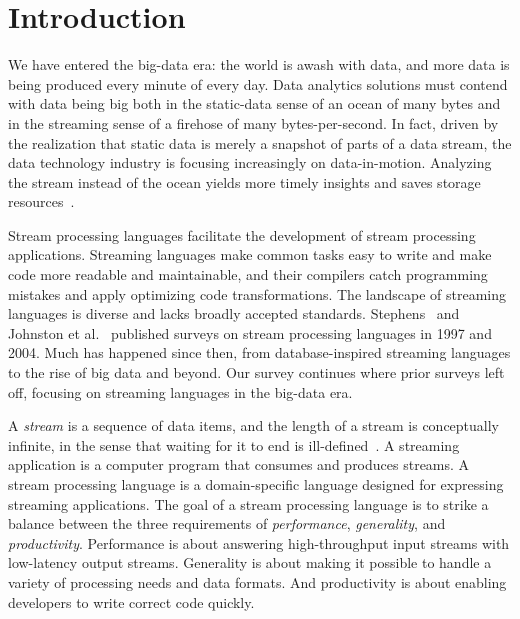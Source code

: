 \section{Introduction}\label{sec:introduction}

We have entered the big-data era: the world is awash with data, and
more data is being produced every minute of every day. Data analytics
solutions must contend with data being big both in the static-data sense of
an ocean of many bytes and in the streaming sense of a firehose of
many bytes-per-second. In fact, driven by the realization that static
data is merely a snapshot of parts of a data stream, the data technology
industry is focusing increasingly on data-in-motion. Analyzing
the stream instead of the ocean yields more timely insights and saves
storage resources~\cite{andrade2014fundamentals}.

Stream processing languages facilitate the development of stream
processing applications. Streaming languages make common tasks easy to
write and make code more readable and maintainable, and their
compilers catch programming mistakes and apply optimizing code
transformations. The landscape of streaming languages is diverse and
lacks broadly accepted standards.  Stephens~\cite{stephens_1997} and
Johnston et al.~\cite{johnston_hanna_millar_2004} published surveys on
stream processing languages in 1997 and 2004. Much has happened since
then, from database-inspired streaming languages to the rise of big
data and beyond. Our survey continues where prior surveys left off,
focusing on streaming languages in the big-data era.

A \emph{stream} is a sequence of data items, and the length of a
stream is conceptually infinite, in the sense that waiting for it to
end is ill-defined~\cite{muthukrishnan2005data}. A streaming application is a computer program that
consumes and produces streams. A stream processing language is a
domain-specific language designed for expressing streaming
applications. The goal of a stream processing language is to strike a
balance between the three requirements of \emph{performance}, \emph{generality}, and
\emph{productivity}. Performance is about answering high-throughput input
streams with low-latency output streams. Generality is about making it
possible to handle a variety of processing needs and data formats. And
productivity is about enabling developers to write correct code
quickly.


